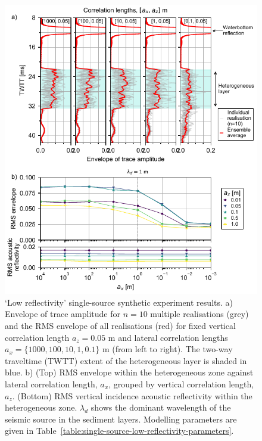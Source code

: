 \documentclass[se,manuscript]{copernicus}
\begin{document}
\begin{figure}
    \includegraphics{figures/si_fig09.pdf}
    \caption{`Low reflectivity' single-source synthetic experiment results.
        a) Envelope of trace amplitude for $n=10$ multiple realisations (grey) and the RMS envelope of all realisations (red) for fixed vertical correlation length $a_z=0.05$ m and lateral correlation lengths $a_x=\{1000, 100, 10, 1, 0.1\}$ \unit{m} (from left to right).
        The two-way traveltime (TWTT) extent of the heterogeneous layer is shaded in blue.
        b) (Top) RMS envelope within the heterogeneous zone against lateral correlation length, $a_x$, grouped by vertical correlation length, $a_z$.
        (Bottom) RMS vertical incidence acoustic reflectivity within the heterogeneous zone.
        $\lambda_d$ shows the dominant wavelength of the seismic source in the sediment layers.
        Modelling parameters are given in Table~\ref{table:single-source-low-reflectivity-parameters}.}
    \label{fig:single-source-low-reflectivity}
\end{figure}

\clearpage
\end{document}
